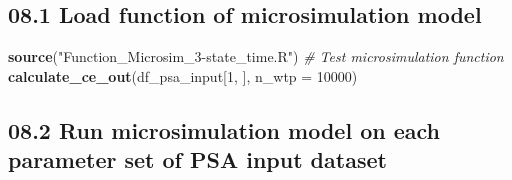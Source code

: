 \documentclass[
]{article}
\newenvironment{Shaded}{\begin{snugshade}}{\end{snugshade}}
\newcommand{\CharTok}[1]{\textcolor[rgb]{0.31,0.60,0.02}{#1}}
\newcommand{\CommentTok}[1]{\textcolor[rgb]{0.56,0.35,0.01}{\textit{#1}}}
\newcommand{\ControlFlowTok}[1]{\textcolor[rgb]{0.13,0.29,0.53}{\textbf{#1}}}
\newcommand{\DataTypeTok}[1]{\textcolor[rgb]{0.13,0.29,0.53}{#1}}
\newcommand{\DecValTok}[1]{\textcolor[rgb]{0.00,0.00,0.81}{#1}}
\newcommand{\KeywordTok}[1]{\textcolor[rgb]{0.13,0.29,0.53}{\textbf{#1}}}
\newcommand{\NormalTok}[1]{#1}
\newcommand{\OperatorTok}[1]{\textcolor[rgb]{0.81,0.36,0.00}{\textbf{#1}}}
\newcommand{\StringTok}[1]{\textcolor[rgb]{0.31,0.60,0.02}{#1}}
\begin{document}
\hypertarget{load-function-of-microsimulation-model}{%
\subsection{08.1 Load function of microsimulation
model}\label{load-function-of-microsimulation-model}}

\begin{Shaded}
\begin{Highlighting}[]
\KeywordTok{source}\NormalTok{(}\StringTok{"Function_Microsim_3-state_time.R"}\NormalTok{)}
\CommentTok{# Test microsimulation function}
\KeywordTok{calculate_ce_out}\NormalTok{(df_psa_input[}\DecValTok{1}\NormalTok{, ], }\DataTypeTok{n_wtp =} \DecValTok{10000}\NormalTok{)}
\end{Highlighting}
\end{Shaded}

\hypertarget{run-microsimulation-model-on-each-parameter-set-of-psa-input-dataset}{%
\subsection{08.2 Run microsimulation model on each parameter set of PSA
input
dataset}\label{run-microsimulation-model-on-each-parameter-set-of-psa-input-dataset}}

\begin{Shaded}
\end{Shaded}
\end{document}
